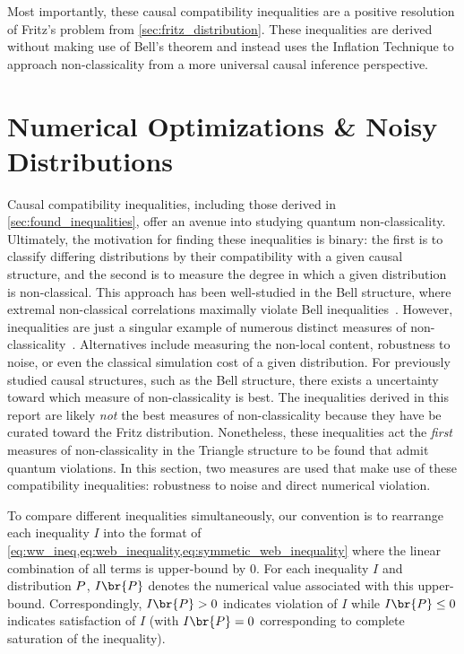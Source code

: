 \documentclass[aps, 10pt, english, twoside, pra, nofootinbib, tightenlines, longbibliography, superscriptaddress]{revtex4-1}
\begin{document}
    Most importantly, these causal compatibility inequalities are a positive resolution of Fritz's problem from \cref{sec:fritz_distribution}. These inequalities are derived without making use of Bell's theorem and instead uses the Inflation Technique to approach non-classicality from a more universal causal inference perspective.

    \section{Numerical Optimizations \& Noisy Distributions}
    \label{sec:violations_noise}
    Causal compatibility inequalities, including those derived in \cref{sec:found_inequalities}, offer an avenue into studying quantum non-classicality. Ultimately, the motivation for finding these inequalities is binary: the first is to classify differing distributions by their compatibility with a given causal structure, and the second is to measure the degree in which a given distribution is non-classical. This approach has been well-studied in the Bell structure, where extremal non-classical correlations maximally violate Bell inequalities~\cite{PR_1995}. However, inequalities are just a singular example of numerous distinct measures of non-classicality~\cite[Section 5]{Vicente_2014}. Alternatives include measuring the non-local content, robustness to noise, or even the classical simulation cost of a given distribution. For previously studied causal structures, such as the Bell structure, there exists a uncertainty toward which measure of non-classicality is best. The inequalities derived in this report are likely \textit{not} the best measures of non-classicality because they have be curated toward the Fritz distribution. Nonetheless, these inequalities act the \textit{first} measures of non-classicality in the Triangle structure to be found that admit quantum violations. In this section, two measures are used that make use of these compatibility inequalities: robustness to noise and direct numerical violation.

    To compare different inequalities simultaneously, our convention is to rearrange each inequality $I$ into the format of \cref{eq:ww_ineq,eq:web_inequality,eq:symmetic_web_inequality} where the linear combination of all terms is upper-bound by $0$. For each inequality $I$ and distribution $\prob$, $I\br{\prob}$ denotes the numerical value associated with this upper-bound. Correspondingly, $I\br{\prob} > 0$ indicates violation of $I$ while $I\br{\prob} \leq 0$ indicates satisfaction of $I$ (with $I\br{\prob} = 0$ corresponding to complete saturation of the inequality).
\end{document}

